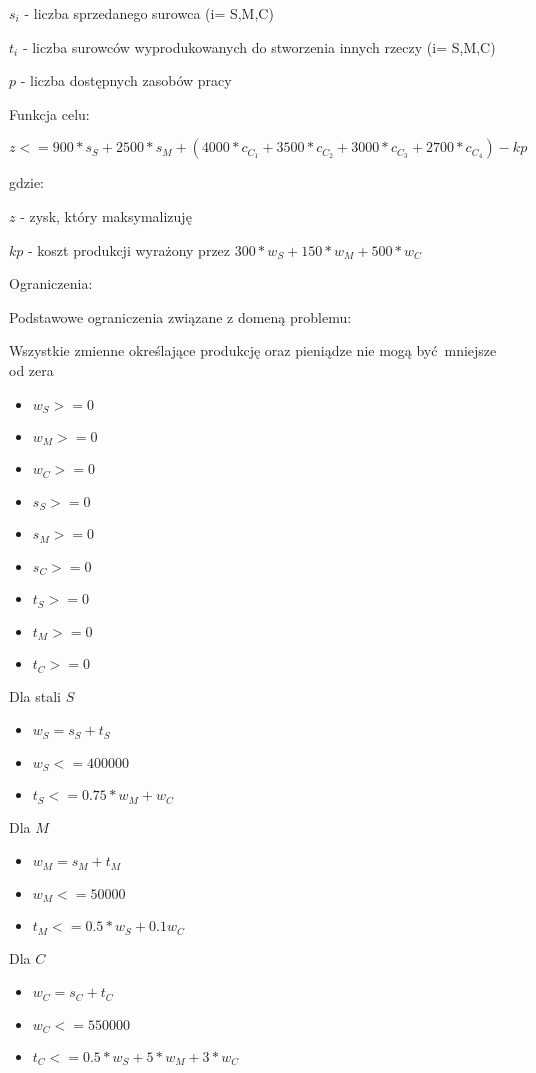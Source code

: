 \documentclass{article}
\begin{document}
$s_i$ - liczba sprzedanego surowca (i= S,M,C)

$t_i$ - liczba surowców wyprodukowanych do stworzenia innych rzeczy (i= S,M,C)

$p$ - liczba dostępnych zasobów pracy

Funkcja celu:

$z <= 900 * s_S + 2500 * s_M + (4000 * c_C_1 + 3500 * c_C_2 + 3000 * c_C_3 + 2700 * c_C_4) - kp$

gdzie:

$z$ - zysk, który maksymalizuję

$kp$ - koszt produkcji wyrażony przez $300 * w_S + 150 * w_M + 500 * w_C$

Ograniczenia:

Podstawowe ograniczenia związane z domeną problemu:

Wszystkie zmienne określające produkcję oraz pieniądze nie mogą być mniejsze od zera

\begin{itemize}
  \item $w_S >= 0$
  \item $w_M >= 0$
  \item $w_C >= 0$
  \item $s_S >= 0$
  \item $s_M >= 0$
  \item $s_C >= 0$
  \item $t_S >= 0$
  \item $t_M >= 0$
  \item $t_C >= 0$
\end{itemize}

Dla stali $S$

\begin{itemize}
  \item $w_S = s_S + t_S$
  \item $w_S <= 400000$
  \item $t_S <= 0.75 * w_M + w_C$
\end{itemize}

Dla $M$

\begin{itemize}
  \item $w_M = s_M + t_M$
  \item $w_M <= 50000$
  \item $t_M <= 0.5 * w_S + 0.1 w_C$
\end{itemize}

Dla $C$

\begin{itemize}
  \item $w_C = s_C + t_C$
  \item $w_C <= 550000$
  \item $t_C <= 0.5 * w_S + 5 * w_M + 3 * w_C$
\end{itemize}
\end{document}
